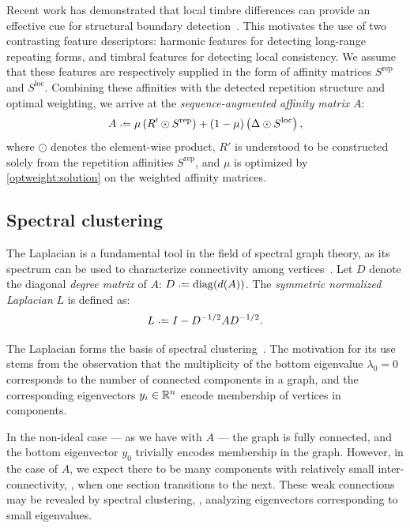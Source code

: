\documentclass{article}
\begin{document}
Recent work has demonstrated that local timbre differences 
can provide an effective cue for structural boundary
detection~\cite{kaiser2013simple}.  This motivates the use of two contrasting feature
descriptors: harmonic features for detecting long-range repeating forms, and timbral
features for detecting local consistency.  We assume that these features are
respectively supplied in the form of affinity matrices $S^\text{rep}$ and
$S^\text{loc}$.  Combining these affinities with the detected repetition structure and
optimal weighting, we arrive at the \emph{sequence-augmented affinity matrix} $A$:
\begin{equation}
A \defeq \mu \left(R' \odot S^\text{rep}\right) + (1-\mu) \left(\Delta \odot
S^\text{loc}\right),\label{saam}
\end{equation}
where $\odot$ denotes the element-wise product, $R'$ is understood to be
constructed solely from the repetition affinities $S^\text{rep}$, and $\mu$ is
optimized by \eqref{optweight:solution} on the weighted affinity matrices.


\subsection{Spectral clustering}

The Laplacian is a fundamental tool in the field of spectral graph
theory, as its spectrum can be used to characterize 
connectivity among vertices~\cite{chung1997spectral}.  
Let $D$ denote the diagonal \emph{degree matrix} of $A$: $D \defeq \diag(d(A))$.  
The \emph{symmetric normalized Laplacian} $L$ is defined as:
\begin{equation}
L \defeq I - D^{-1/2} A D^{-1/2}.\label{symlaplacian}
\end{equation}

The Laplacian forms the basis of spectral clustering~\cite{von2007tutorial}.  The
motivation for its use stems from the observation that the multiplicity of the bottom
eigenvalue $\lambda_0 = 0$ corresponds to the number of connected components in a
graph, and the corresponding eigenvectors $y_i \in \mathbb{R}^n$ encode membership of vertices
in components.

In the non-ideal case --- as we have with $A$ --- the graph is fully connected, and
the bottom eigenvector $y_0$ trivially encodes membership in the graph.  
However, in the case of $A$, we expect there to be many components
with relatively small inter-connectivity, \ie, when one section transitions to the
next.  These weak connections may be revealed by spectral clustering, \ie, analyzing 
eigenvectors corresponding to small eigenvalues.
\end{document}
